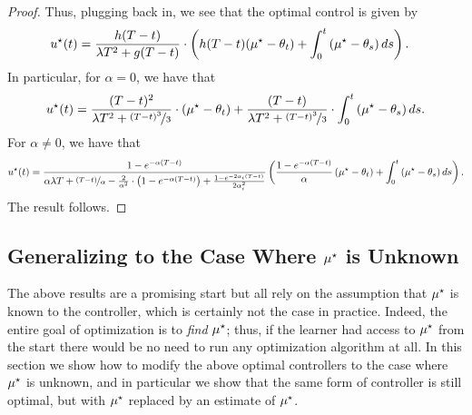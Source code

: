 \begin{proof}
    Thus, plugging back in, we see that the optimal control is given by
    \begin{align}
        u^{\star}(t) &= \frac{h(T - t)}{\lambda T^2 + g(T - t)} \cdot \left( h(T -t) (\mu^{\star} - \theta_t) + \int_0^t \left( \mu^{\star} - \theta_s \right) ds \right).
    \end{align}
    In particular, for $\alpha = 0$, we have that
    \begin{align}
        u^{\star}(t) = \frac{(T - t)^2}{\lambda T^2 + \nicefrac{(T - t)^3}{3}} \cdot \left( \mu^{\star} - \theta_t \right) + \frac{(T - t)}{\lambda T^2 + \nicefrac{(T - t)^3}{3}} \cdot \int_0^t \left( \mu^{\star} - \theta_s \right) d s.
    \end{align}
    For $\alpha \neq 0$, we have that
    \begin{align}
        u^{\star}(t) = \frac{1 - e^{- \alpha (T - t)}}{\alpha \lambda T + \nicefrac{(T - t)}{\alpha} - \frac{2}{ \alpha^2} \cdot \left( 1 - e^{- \alpha (T - t)} \right) + \frac{1 - e^{- 2 \alpha_i (T - t)}}{2 \alpha_i^2}} \left( \frac{1 - e^{- \alpha (T -t)}}{\alpha} \left( \mu^{\star} - \theta_t \right) + \int_0^t \left( \mu^{\star} - \theta_s \right) d s\right).
    \end{align}
    The result follows.
\end{proof}




\subsection{Generalizing to the Case Where $\mu^{\star}$ is Unknown}\label{app:unknown_mustar}

The above results are a promising start but all rely on the assumption that $\mu^{\star}$ is known to the controller, which is certainly not the case in practice.  Indeed, the entire goal of optimization is to \emph{find} $\mu^{\star}$; thus, if the learner had access to $\mu^{\star}$ from the start there would be no need to run any optimization algorithm at all.  In this section we show how to modify the above optimal controllers to the case where $\mu^{\star}$ is unknown, and in particular we show that the same form of controller is still optimal, but with $\mu^{\star}$ replaced by an estimate of $\mu^{\star}$.

